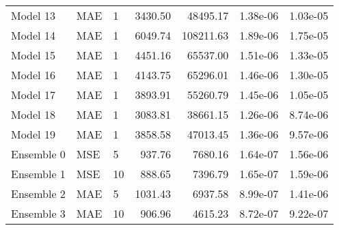 \begin{tabular}{lllrrrr}
Model 13   &               MAE &         1 &         3430.50 &                48495.17 &          1.38e-06 &                  1.03e-05 \\
Model 14   &               MAE &         1 &         6049.74 &               108211.63 &          1.89e-06 &                  1.75e-05 \\
Model 15   &               MAE &         1 &         4451.16 &                65537.00 &          1.51e-06 &                  1.33e-05 \\
Model 16   &               MAE &         1 &         4143.75 &                65296.01 &          1.46e-06 &                  1.30e-05 \\
Model 17   &               MAE &         1 &         3893.91 &                55260.79 &          1.45e-06 &                  1.05e-05 \\
Model 18   &               MAE &         1 &         3083.81 &                38661.15 &          1.26e-06 &                  8.74e-06 \\
Model 19   &               MAE &         1 &         3858.58 &                47013.45 &          1.36e-06 &                  9.57e-06 \\
Ensemble 0 &               MSE &         5 &          937.76 &                 7680.16 &          1.64e-07 &                  1.56e-06 \\
Ensemble 1 &               MSE &        10 &          888.65 &                 7396.79 &          1.65e-07 &                  1.59e-06 \\
Ensemble 2 &               MAE &         5 &         1031.43 &                 6937.58 &          8.99e-07 &                  1.41e-06 \\
Ensemble 3 &               MAE &        10 &          906.96 &                 4615.23 &          8.72e-07 &                  9.22e-07 \\
\bottomrule
\end{tabular}
